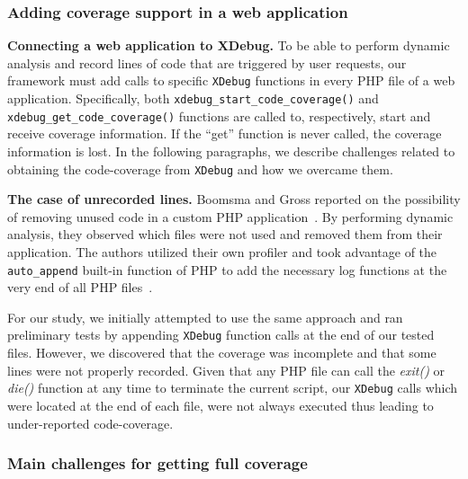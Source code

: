 \subsubsection{Adding coverage support in a web application}

\vspace{1ex}
\noindent\textbf{Connecting a web application to XDebug.}
To be able to perform dynamic analysis and record lines of code
that are triggered by user requests, our framework must add calls
to specific \texttt{XDebug} functions in every PHP file of a web
application. Specifically, both \texttt{xdebug\_start\_code\_coverage()} and
\texttt{xdebug\_get\_code\_coverage()} functions are called to, respectively,
start and receive coverage information. If the ``get'' function is never
called, the coverage information is lost. In the following paragraphs, we
describe challenges related to obtaining the code-coverage from \texttt{XDebug}
and how we overcame them.

\vspace{1ex}
\noindent\textbf{The case of unrecorded lines.}
Boomsma and Gross reported on the possibility of removing unused code in a
custom PHP application~\cite{boomsma2012Dead}. By performing dynamic
analysis, they observed which files were not used and removed
them from their application. The authors utilized their own profiler and took
advantage of the \texttt{auto\_append} built-in function of PHP to add
the necessary log functions at the very end of all PHP files~\cite{autoappend}.

For our study, we initially attempted to use the same approach and ran
preliminary tests by appending \texttt{XDebug} function calls at the end
of our tested files. However, we discovered that the coverage was
incomplete and that some lines were not properly recorded. Given that any
PHP file can call the \textit{exit()} or \textit{die()} function at any
time to terminate the current script, our \texttt{XDebug} calls which were
located at the end of each file, were not always executed thus leading to
under-reported code-coverage.




\subsubsection{Main challenges for getting full coverage}
\label{subsubsec:challenges}

